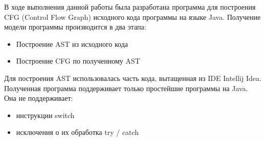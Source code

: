 В ходе выполнения данной работы была разработана программа для построения CFG (Control Flow Graph) исходного кода программы на языке Java. Получение модели программы производится в два этапа:
\begin{itemize}
\item Построение AST из исходного кода 
\item Построение CFG по полученному AST
\end{itemize}
Для построения AST использовалась часть кода, вытащенная из IDE Intellij Idea. Полученная программа поддерживает только простейшие программы на Java. Она не поддерживает:
\begin{itemize}
\item инструкции switch
\item исключения о их обработка try / catch
\end{itemize}

